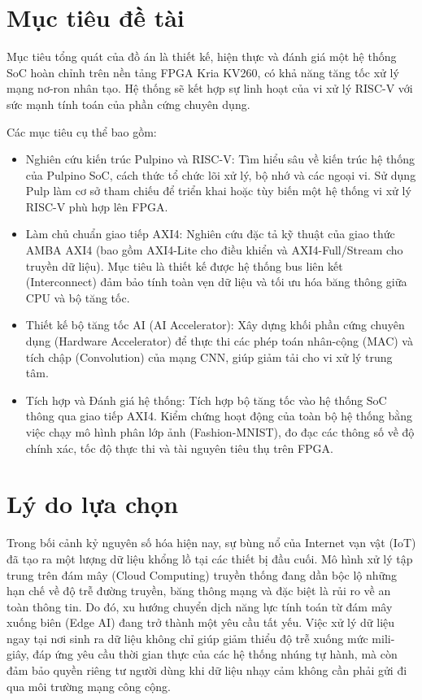 \section{Mục tiêu đề tài}
Mục tiêu tổng quát của đồ án là thiết kế, hiện thực và đánh giá một hệ thống SoC hoàn chỉnh trên nền tảng FPGA Kria KV260, có khả năng tăng tốc xử lý mạng nơ-ron nhân tạo. Hệ thống sẽ kết hợp sự linh hoạt của vi xử lý RISC-V với sức mạnh tính toán của phần cứng chuyên dụng.

Các mục tiêu cụ thể bao gồm:
\begin{itemize}
    \item Nghiên cứu kiến trúc Pulpino và RISC-V: Tìm hiểu sâu về kiến trúc hệ thống của Pulpino SoC, cách thức tổ chức lõi xử lý, bộ nhớ và các ngoại vi. Sử dụng Pulp làm cơ sở tham chiếu để triển khai hoặc tùy biến một hệ thống vi xử lý RISC-V phù hợp lên FPGA.
    \item Làm chủ chuẩn giao tiếp AXI4: Nghiên cứu đặc tả kỹ thuật của giao thức AMBA AXI4 (bao gồm AXI4-Lite cho điều khiển và AXI4-Full/Stream cho truyền dữ liệu). Mục tiêu là thiết kế được hệ thống bus liên kết (Interconnect) đảm bảo tính toàn vẹn dữ liệu và tối ưu hóa băng thông giữa CPU và bộ tăng tốc.
    \item Thiết kế bộ tăng tốc AI (AI Accelerator): Xây dựng khối phần cứng chuyên dụng (Hardware Accelerator) để thực thi các phép toán nhân-cộng (MAC) và tích chập (Convolution) của mạng CNN, giúp giảm tải cho vi xử lý trung tâm.
    \item Tích hợp và Đánh giá hệ thống: Tích hợp bộ tăng tốc vào hệ thống SoC thông qua giao tiếp AXI4. Kiểm chứng hoạt động của toàn bộ hệ thống bằng việc chạy mô hình phân lớp ảnh (Fashion-MNIST), đo đạc các thông số về độ chính xác, tốc độ thực thi và tài nguyên tiêu thụ trên FPGA.
\end{itemize}

\newpage
\section{Lý do lựa chọn}

Trong bối cảnh kỷ nguyên số hóa hiện nay, sự bùng nổ của Internet vạn vật (IoT) đã tạo ra một lượng dữ liệu khổng lồ tại các thiết bị đầu cuối. Mô hình xử lý tập trung trên đám mây (Cloud Computing) truyền thống đang dần bộc lộ những hạn chế về độ trễ đường truyền, băng thông mạng và đặc biệt là rủi ro về an toàn thông tin. Do đó, xu hướng chuyển dịch năng lực tính toán từ đám mây xuống biên (Edge AI) đang trở thành một yêu cầu tất yếu. Việc xử lý dữ liệu ngay tại nơi sinh ra dữ liệu không chỉ giúp giảm thiểu độ trễ xuống mức mili-giây, đáp ứng yêu cầu thời gian thực của các hệ thống nhúng tự hành, mà còn đảm bảo quyền riêng tư người dùng khi dữ liệu nhạy cảm không cần phải gửi đi qua môi trường mạng công cộng.

